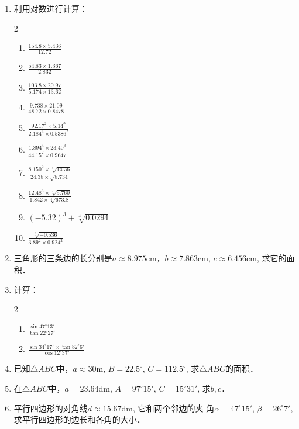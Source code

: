 \begin{enumerate}
    \item 利用对数进行计算：
\begin{multicols}{2}
\begin{enumerate}
    \item $\frac{154.8 \times 5.436}{12.72}$
    \item $\frac{54.83 \times 1.367}{2.832}$
    \item $\frac{103.8 \times 20.97}{5.174 \times 13.62}$
    \item $\frac{9.738 \times 21.09}{48.72 \times 0.8478}$
    \item $\frac{92.17^{2} \times 5.14^{3}}{2.184^{4} \times 0.5386^{2}}$
    \item $\frac{1.894^{4} \times 23.40^{3}}{44.15^{2} \times 0.9647}$
    \item  $\frac{8.150^{2} \times \sqrt[3]{14.36}}{24.38 \times \sqrt{8.734}}$
    \item $ \frac{12.48^{3} \times \sqrt[4]{5.760}}{1.842 \times \sqrt[3]{673.8}}$
    \item $(-5.32)^{3}+\sqrt[4]{0.0294}$
    \item $\frac{\sqrt[3]{-0.536}}{3.89^{2} \times 0.924^{2}}$
\end{enumerate}
\end{multicols}
\item 三角形的三条边的长分别是$a\approx 8.975$cm，$b \approx 7.863$cm, $c\approx 6.456$cm, 求它的面积．

\item  计算：
\begin{multicols}{2}
\begin{enumerate}
    \item $\frac{\sin 47^{\circ} 13'}{\tan22^{\circ} 27'}$
    \item $\frac{\sin 34^{\circ} 17' \times \tan82^{\circ} 6'}{\cos 12^{\circ} 37'}$
\end{enumerate}
\end{multicols}
\item 已知$\triangle ABC$中，$a\approx30$m, $B=22.5^{\circ}$, $C=112.5^{\circ}$, 求$\triangle ABC$的面积．

\item 在$\triangle ABC$中，$a=23.64$dm, $A=97^{\circ}15'$, $C=15^{\circ}31'$,
求$b,c$．
\item 
平行四边形的对角线$d\approx 15.67$dm, 它和两个邻边的夹
角$\alpha=47^{\circ}15'$, $\beta=26^{\circ}7'$, 求平行四边形的边长和各角的大小．


\end{enumerate}
